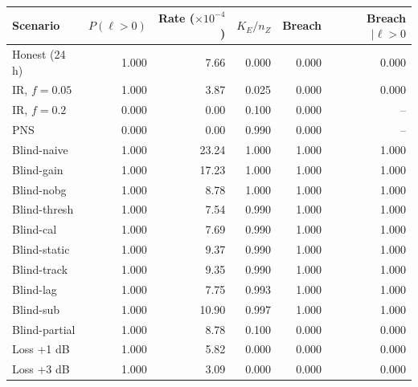 \begin{tabular}{lrrrrr}
\hline
Scenario & $P(\ell>0)$ & Rate ($\times10^{-4}$) & $K_E/n_Z$ & Breach & Breach $\mid \ell>0$ \\
\hline
Honest (24 h) & 1.000 & 7.66 & 0.000 & 0.000 & 0.000\\
IR, $f=0.05$ & 1.000 & 3.87 & 0.025 & 0.000 & 0.000\\
IR, $f=0.2$ & 0.000 & 0.00 & 0.100 & 0.000 & --\\
PNS & 0.000 & 0.00 & 0.990 & 0.000 & --\\
Blind-naive & 1.000 & 23.24 & 1.000 & 1.000 & 1.000\\
Blind-gain & 1.000 & 17.23 & 1.000 & 1.000 & 1.000\\
Blind-nobg & 1.000 & 8.78 & 1.000 & 1.000 & 1.000\\
Blind-thresh & 1.000 & 7.54 & 0.990 & 1.000 & 1.000\\
Blind-cal & 1.000 & 7.69 & 0.990 & 1.000 & 1.000\\
Blind-static & 1.000 & 9.37 & 0.990 & 1.000 & 1.000\\
Blind-track & 1.000 & 9.35 & 0.990 & 1.000 & 1.000\\
Blind-lag & 1.000 & 7.75 & 0.993 & 1.000 & 1.000\\
Blind-sub & 1.000 & 10.90 & 0.997 & 1.000 & 1.000\\
Blind-partial & 1.000 & 8.78 & 0.100 & 0.000 & 0.000\\
Loss +1 dB & 1.000 & 5.82 & 0.000 & 0.000 & 0.000\\
Loss +3 dB & 1.000 & 3.09 & 0.000 & 0.000 & 0.000\\
\hline
\end{tabular}